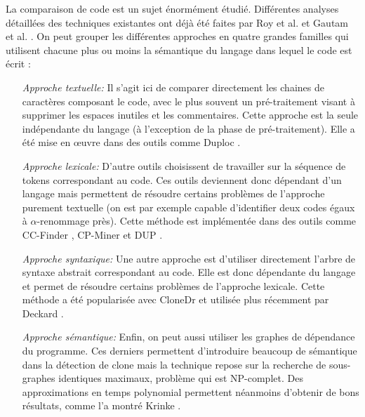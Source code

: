 
La comparaison de code est un sujet énormément étudié.
Différentes analyses détaillées des techniques existantes ont déjà été faites par Roy et al. \cite{ComparisonAndEvaluation} et Gautam et al. \cite{variousCodeClone}.
On peut grouper les différentes approches en quatre grandes familles qui utilisent chacune plus ou moins la sémantique du langage dans lequel le code est écrit :
\\
\begin{itemize}
\item[\emph{Approche textuelle:}] Il s'agit ici de comparer directement les chaines de caractères composant le code, avec le plus souvent un pré-traitement visant à supprimer les espaces inutiles et les commentaires. Cette approche est la seule indépendante du langage (à l'exception de la phase de pré-traitement). Elle a été mise en œuvre dans des outils comme Duploc \cite{ALanguageIndependent}.

\item[\emph{Approche lexicale:}] D'autre outils choisissent de travailler sur la séquence de tokens correspondant au code. Ces outils deviennent donc dépendant d'un langage mais permettent de résoudre certains problèmes de l'approche purement textuelle (on est par exemple capable d'identifier deux codes égaux à $\alpha$-renommage près).
Cette méthode est implémentée dans des outils comme CC-Finder \cite{ccfinder}, CP-Miner \cite{cpminer} et DUP \cite{dup}.

\item[\emph{Approche syntaxique:}] Une autre approche est d'utiliser directement l'arbre de syntaxe abstrait correspondant au code. Elle est donc dépendante du langage et permet de résoudre certains problèmes de l'approche lexicale. Cette méthode a été popularisée avec CloneDr \cite{CloneDetectionUsingAST} et utilisée plus récemment par Deckard \cite{Deckard}.

\item[\emph{Approche sémantique:}] Enfin, on peut aussi utiliser les graphes de dépendance \cite{PdgOrigin} du programme. Ces derniers permettent d'introduire beaucoup de sémantique dans la détection de clone mais la technique repose sur la recherche de sous-graphes identiques maximaux, problème qui est NP-complet. Des approximations en temps polynomial permettent néanmoins d'obtenir de bons résultats, comme l'a montré Krinke \cite{PDG}.
\end{itemize}
